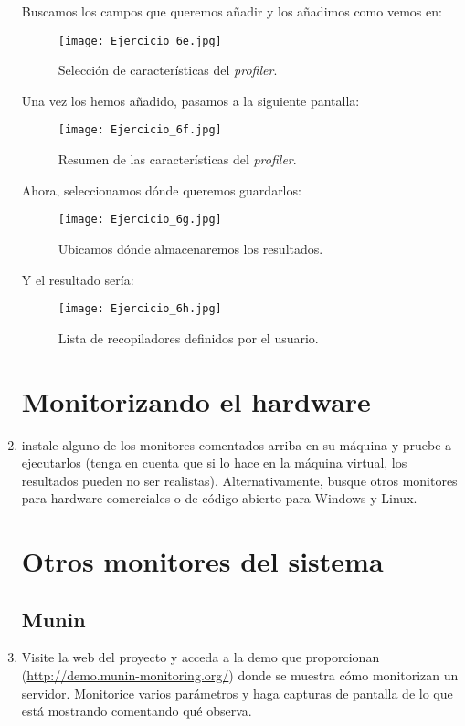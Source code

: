 \documentclass[paper=a4, fontsize=11pt]{scrartcl} %
\numberwithin{equation}{section} %
\numberwithin{figure}{section} %
\numberwithin{table}{section} %
\begin{document}
\begin{enumerate}
		Buscamos los campos que queremos añadir y los añadimos como vemos en:
		
		\begin{figure}[H]
			\texttt{[image: Ejercicio\_6e.jpg]}
			\caption{Selección de características del \textit{profiler}.}
			\label{fig:SP_configure}
		\end{figure}
		
		Una vez los hemos añadido, pasamos a la siguiente pantalla:
		
		\begin{figure}[H]
			\centering
			\texttt{[image: Ejercicio\_6f.jpg]}
			\caption{Resumen de las características del \textit{profiler}.}
			\label{fig:SP_summary}
		\end{figure}
		
		Ahora, seleccionamos dónde queremos guardarlos:
		 
		\begin{figure}[H]
			\centering
			\texttt{[image: Ejercicio\_6g.jpg]}
			\caption{Ubicamos dónde almacenaremos los resultados.}
			\label{fig:SP_save}
		\end{figure}
		
		Y el resultado sería:
		
		\begin{figure}[H]
			\centering
			\texttt{[image: Ejercicio\_6h.jpg]}
			\caption{Lista de recopiladores definidos por el usuario.}
			\label{fig:SP_all}
		\end{figure}
		
	\section{Monitorizando el hardware}
		\item instale alguno de los monitores comentados arriba en su máquina y pruebe a ejecutarlos
		(tenga en cuenta que si lo hace en la máquina virtual, los resultados pueden no ser
		realistas). Alternativamente, busque otros monitores para hardware comerciales o de código
		abierto para Windows y Linux.
		
	\section{Otros monitores del sistema}
	\subsection{Munin}
		\item Visite la web del proyecto y acceda a la demo que proporcionan
		(\url{http://demo.munin-monitoring.org/}) donde se muestra cómo monitorizan un servidor.
		Monitorice varios parámetros y haga capturas de pantalla de lo que está mostrando comentando
		qué observa.

\end{enumerate}
\end{document}
